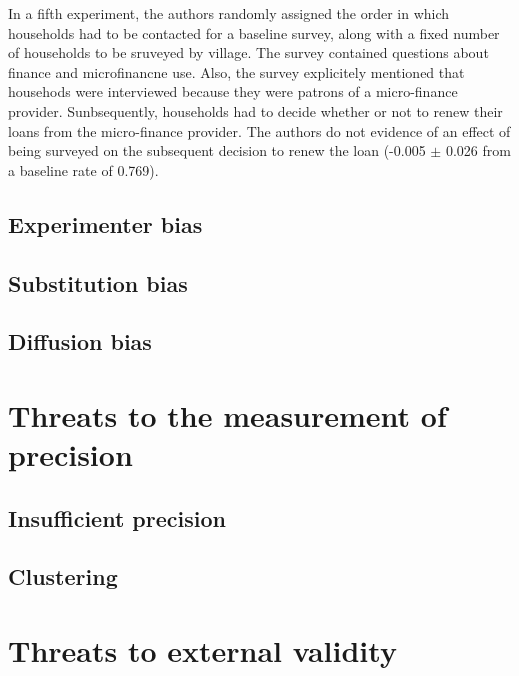 \documentclass[]{book}
\theoremstyle{definition}
\theoremstyle{definition}
\theoremstyle{definition}
\theoremstyle{remark}
\begin{document}
In a fifth experiment, the authors randomly assigned the order in which households had to be contacted for a baseline survey, along with a fixed number of households to be sruveyed by village.
The survey contained questions about finance and microfinancne use.
Also, the survey explicitely mentioned that househods were interviewed because they were patrons of a micro-finance provider.
Sunbsequently, households had to decide whether or not to renew their loans from the micro-finance provider.
The authors do not evidence of an effect of being surveyed on the subsequent decision to renew the loan (-0.005 \(\pm\) 0.026 from a baseline rate of 0.769).

\hypertarget{experimenter-bias}{%
\subsection{Experimenter bias}\label{experimenter-bias}}

\hypertarget{substitution-bias}{%
\subsection{Substitution bias}\label{substitution-bias}}

\hypertarget{diffusion-bias}{%
\subsection{Diffusion bias}\label{diffusion-bias}}

\hypertarget{threats-to-the-measurement-of-precision}{%
\section{Threats to the measurement of precision}\label{threats-to-the-measurement-of-precision}}

\hypertarget{insufficient-precision}{%
\subsection{Insufficient precision}\label{insufficient-precision}}

\hypertarget{clustering}{%
\subsection{Clustering}\label{clustering}}

\hypertarget{threats-to-external-validity}{%
\section{Threats to external validity}\label{threats-to-external-validity}}
\end{document}

